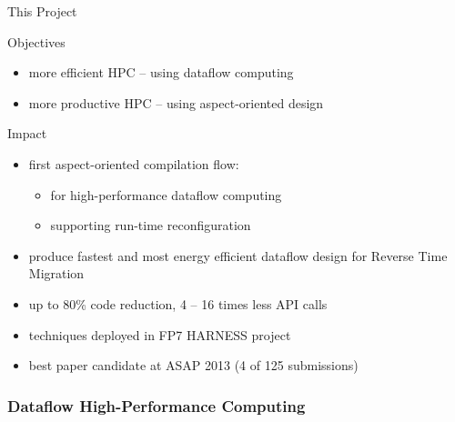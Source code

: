\begin{frame}{This Project}
  \begin{beamerboxesrounded}{Objectives}
    \begin{itemize}
    \item more efficient HPC -- using dataflow computing
    \item more productive HPC -- using aspect-oriented design
    \end{itemize}
  \end{beamerboxesrounded}
  \vspace{0.3cm}
  \begin{beamerboxesrounded}{Impact}
    \begin{itemize}
    \item first aspect-oriented compilation flow:
      \begin{itemize}
      \item for high-performance dataflow computing
      \item supporting run-time reconfiguration
      \end{itemize}
    \item produce fastest and most energy efficient dataflow design for
      Reverse Time Migration
    \item up to 80\% code reduction, 4 -- 16 times less API calls
    \item techniques deployed in FP7 HARNESS project
    \item best paper candidate at ASAP 2013 (4 of 125 submissions)
    \end{itemize}
  \end{beamerboxesrounded}
\end{frame}

\begin{frame}
  \frametitle{Dataflow High-Performance Computing}
  \begin{figure}[!ht]
    \centering
    \def\svgwidth{0.9\linewidth}
    
  \end{figure}
\end{frame}

